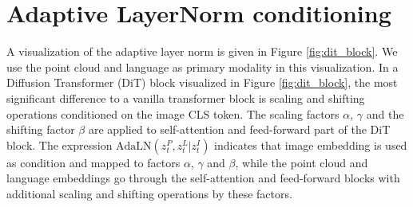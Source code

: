 \section{Adaptive LayerNorm conditioning}
\label{sec:adaln}

A visualization of the adaptive layer norm is given in Figure \ref{fig:dit_block}. We use the point cloud and language as primary modality in this visualization. In a Diffusion Transformer (DiT) block visualized in Figure \ref{fig:dit_block}, the most significant difference to a vanilla transformer block is scaling and shifting operations conditioned on the image CLS token. The scaling factors $\alpha$, $\gamma$ and the shifting factor $\beta$ are applied to self-attention and feed-forward part of the DiT block. The expression $\text{AdaLN}(z_t^P, z_t^L | z_t^I)$ indicates that image embedding is used as condition and mapped to factors $\alpha$, $\gamma$ and $\beta$, while the point cloud and language embeddings go through the self-attention and feed-forward blocks with additional scaling and shifting operations by these factors.

